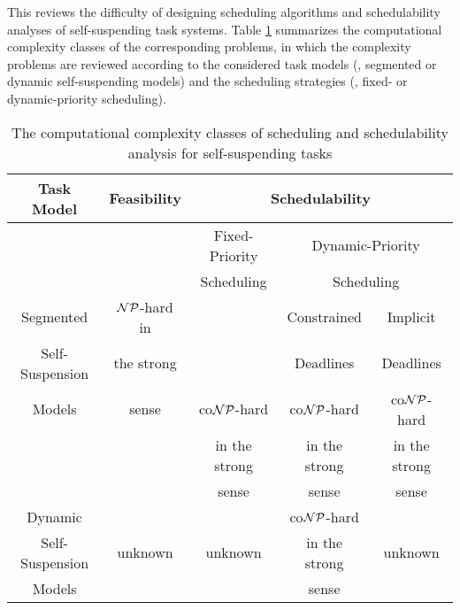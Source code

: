 \label{sec:hardness}
This \mysectionrefnormal{} reviews the difficulty of designing scheduling algorithms and schedulability analyses of self-suspending task systems. Table \ref{table:complexity} summarizes the computational complexity classes of the corresponding problems, in which the complexity problems are reviewed according to the considered task models (\ie, segmented or dynamic self-suspending models) and the scheduling strategies (\ie, fixed- or dynamic-priority scheduling). 


\begin{table}[t]
\centering
    \begin{tabular}{|c|c|c|c|c|}
 \hline
        Task Model & Feasibility & \multicolumn{3}{c|}{Schedulability} \\
        \hline
        &  & Fixed-Priority & \multicolumn{2}{c|}{Dynamic-Priority}\\
        &  & Scheduling     & \multicolumn{2}{c|}{Scheduling}\\
        \cline{3-5}    
        Segmented & ${\cal NP}$-hard in &  & Constrained & Implicit\\
         Self-Suspension  & the strong &   & Deadlines   & Deadlines \\
        \cline{4-5}
        Models & sense \cite{Ric03,Ridouard_2004} & co${\cal NP}$-hard& co${\cal NP}$-hard & co${\cal NP}$-hard \\
        &  & in the strong & in the strong & in the strong\\
        & & sense \cite{DBLP:conf/rtns/MohaqeqiE016,RTSS2016-suspension}& sense \cite{RTSS2016-suspension}& sense \cite{RTSS2016-suspension}\\
        \hline
        Dynamic & \multirow{3}{*}{unknown} & & co${\cal NP}$-hard & \multirow{3}{*}{unknown}\\
         Self-Suspension & & unknown &in the strong& \\
        Models & & & sense \cite{RTSS2016-suspension}& \\
        \hline
    \end{tabular}
    \vskip 0.2in
    \caption{The computational complexity classes of scheduling and schedulability analysis for self-suspending tasks}
    \label{table:complexity}
\end{table}

